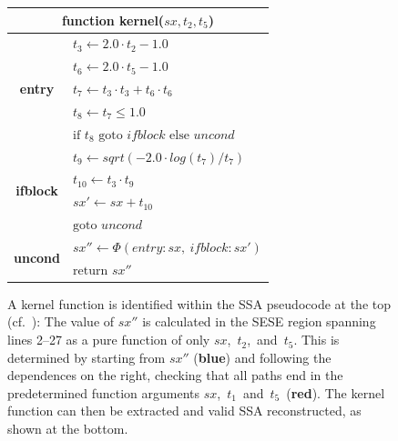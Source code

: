 \begin{figure}[p]
\begin{tabular}{|cl|}
\multicolumn{2}{c}{{\bf function} kernel($sx, t_2, t_5$)}\\
\hline
\multirow{5}{*}{\bf entry} & $t_3 \leftarrow 2.0\cdot t_2-1.0$\\[-1.7mm]
                           & $t_6 \leftarrow 2.0\cdot t_5-1.0$\\[-1.7mm]
                           & $t_7 \leftarrow t_3\cdot t_3+t_6\cdot t_6$\\[-1.7mm]
                           & $t_8 \leftarrow t_7\leq 1.0$\\[-1.7mm]
                           & $\text{if }t_8\text{ goto }ifblock\text{ else }uncond$\\
\hline
\multirow{4}{*}{\bf ifblock} & $t_9\leftarrow sqrt(-2.0\cdot log(t_7) / t_7)$\\[-1.7mm]
                             & $t_{10}\leftarrow t_3\cdot t_9$\\[-1.7mm]
                             & $sx'\leftarrow sx+t_{10}$\\[-1.7mm]
                             & $\text{goto }uncond$\\
\hline
\multirow{2}{*}{\bf uncond} & $sx''\leftarrow\Phi(entry:sx,\ ifblock:sx')$\\[-1.7mm]
                            & $\text{return }sx''$\\
\hline
\end{tabular}
\caption{A kernel function is identified within the SSA pseudocode at the top
    (cf.\ ):
    The value of $sx''$ is calculated in the SESE region spanning lines 2--27
    as a pure function of only \mbox{$sx$, $t_2$, and $t_5$}.
    This is determined by starting from $sx''$
    (\textcolor{color_keywords}{\bf blue}) and following the dependences on the
    right, checking that all paths end in the predetermined function arguments
    \mbox{$sx$, $t_1$ and $t_5$ (\textcolor{color_types}{\bf red})}.
    The kernel function can then be extracted and valid SSA
    reconstructed, as shown at the bottom.
    \parfillskip=0pt}
\label{kernelexample}
\end{figure}


